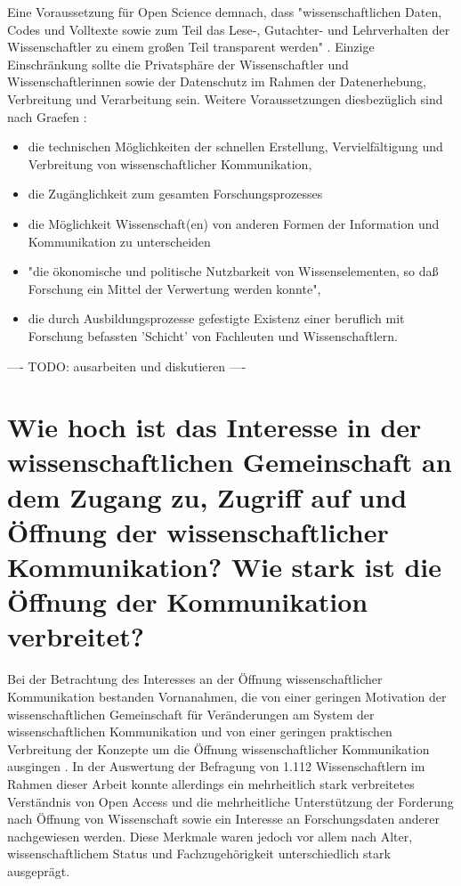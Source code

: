 Eine Voraussetzung für Open Science demnach, dass "wissenschaftlichen Daten, Codes und Volltexte sowie zum Teil das Lese-, Gutachter- und Lehrverhalten der Wissenschaftler zu einem großen Teil transparent werden" \cite{brembs2015open}. Einzige Einschränkung sollte die Privatsphäre der Wissenschaftler und Wissenschaftlerinnen sowie der Datenschutz im Rahmen der Datenerhebung, Verbreitung und Verarbeitung sein. Weitere Voraussetzungen diesbezüglich sind nach Graefen \cite{graefen2007_wissenschaftliche_artikel}:
\begin{itemize}
\item die technischen Möglichkeiten der schnellen Erstellung, Vervielfältigung und Verbreitung von wissenschaftlicher Kommunikation,
\item die Zugänglichkeit zum gesamten Forschungsprozesses
\item die Möglichkeit Wissenschaft(en) von anderen Formen der Information und Kommunikation zu unterscheiden
\item "die ökonomische und politische Nutzbarkeit von Wissenselementen, so daß
Forschung ein Mittel der Verwertung werden konnte",
\item die durch Ausbildungsprozesse gefestigte Existenz einer beruflich mit Forschung befassten 'Schicht' von Fachleuten und Wissenschaftlern.
\end{itemize}

---- TODO: ausarbeiten und diskutieren ----

\section{Wie hoch ist das Interesse in der wissenschaftlichen Gemeinschaft an dem Zugang zu, Zugriff auf und Öffnung der wissenschaftlicher Kommunikation? Wie stark ist die Öffnung der Kommunikation verbreitet?}

Bei der Betrachtung des Interesses an der Öffnung wissenschaftlicher Kommunikation bestanden Vornanahmen, die von einer geringen Motivation der wissenschaftlichen Gemeinschaft für Veränderungen am System der wissenschaftlichen Kommunikation \cite{hagner_2015_sache_buches} und von einer geringen praktischen Verbreitung der Konzepte um die Öffnung wissenschaftlicher Kommunikation ausgingen \cite{Scheliga_2014}. In der Auswertung der Befragung von 1.112 Wissenschaftlern im Rahmen dieser Arbeit konnte allerdings ein mehrheitlich stark verbreitetes Verständnis von Open Access und die mehrheitliche Unterstützung der Forderung nach Öffnung von Wissenschaft sowie ein Interesse an Forschungsdaten anderer nachgewiesen werden. Diese Merkmale waren jedoch vor allem nach Alter, wissenschaftlichem Status und Fachzugehörigkeit unterschiedlich stark ausgeprägt.

